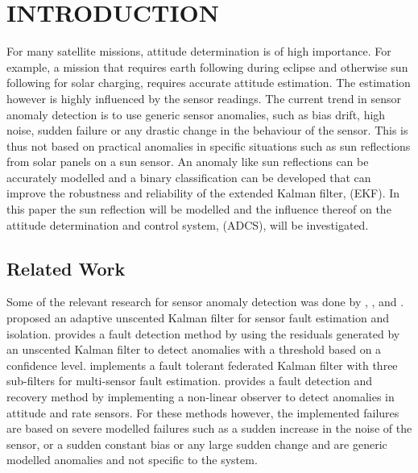 \documentclass[letterpaper, 10 pt, conference]{ieeeconf}  %
\begin{document}
\section{INTRODUCTION}
For many satellite missions, attitude determination is of high importance. For example, a mission that requires earth following during eclipse and otherwise sun following for solar charging, requires accurate attitude estimation. The estimation however is highly influenced by the sensor readings. The current trend in sensor anomaly detection is to use generic sensor anomalies, such as bias drift, high noise, sudden failure or any drastic change in the behaviour of the sensor. This is thus not based on practical anomalies in specific situations such as sun reflections from solar panels on a sun sensor. An anomaly like sun reflections can be accurately modelled and a binary classification can be developed that can improve the robustness and reliability of the extended Kalman filter, (EKF). In this paper the sun reflection will be modelled and the influence thereof on the attitude determination and control system, (ADCS), will be investigated.


\subsection{Related Work}
Some of the relevant research for sensor anomaly detection was done by \textcite{wang2019adaptive}, \textcite{Xiong2007}, \textcite{Zhou2016} and \textcite{Nasrolahi2018}. \textcite{wang2019adaptive} proposed an adaptive unscented Kalman filter for sensor fault estimation and isolation. \textcite{Xiong2007} provides a fault detection method by using the residuals generated by an unscented Kalman filter to detect anomalies with a threshold based on a confidence level. \textcite{Zhou2016} implements a fault tolerant federated Kalman filter with three sub-filters for multi-sensor fault estimation. \textcite{Nasrolahi2018} provides a fault detection and recovery method by implementing a non-linear observer to detect anomalies in attitude and rate sensors. For these methods however, the implemented failures are based on severe modelled failures such as a sudden increase in the noise of the sensor, or a sudden constant bias or any large sudden change and are generic modelled anomalies and not specific to the system. 
\end{document}
